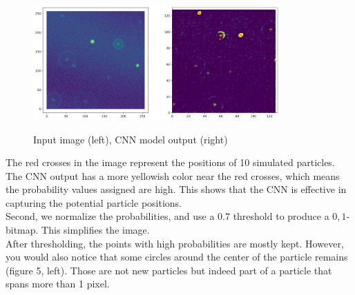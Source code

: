 \documentclass[11pt,a4paper]{scrartcl}
\begin{document}
\begin{figure}[h]
    \begin{center}
        \includegraphics[width = 0.43\textwidth]{img/input_vid}
        \includegraphics[width = 0.4\textwidth]{img/cnn_output}
    \end{center}
    \caption{Input image (left), CNN model output (right)}
\end{figure} 

The red crosses in the image represent the positions of 10 simulated particles. The CNN output has a more yellowish color near the red crosses, which means the probability values assigned are high. This shows that the CNN is effective in  capturing the potential particle positions. \\

Second, we normalize the probabilities, and use a $0.7$ threshold to produce a $0,1$-bitmap. This simplifies the image. \\

After thresholding, the points with high probabilities are mostly kept. However, you would also notice that some circles around the center of the particle remains (figure 5, left). Those are not new particles but indeed part of a particle that spans more than 1 pixel.
\end{document}
